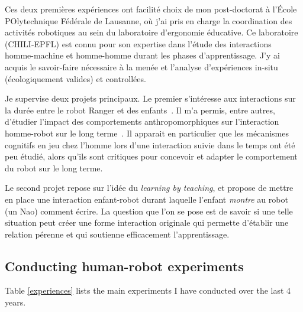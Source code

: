 \documentclass[a4paper]{article}
\begin{document}
Ces deux premières expériences ont facilité choix de mon post-doctorat à l'École
POlytechnique Fédérale de Lausanne, où j'ai pris en charge la coordination des
activités robotiques au sein du laboratoire d'ergonomie éducative. Ce
laboratoire (CHILI-EPFL) est connu pour son expertise dans l'étude des
interactions homme-machine et homme-homme durant les phases d'apprentissage. J'y
ai acquis le savoir-faire nécessaire à la menée et l'analyse d'expériences
in-situ (écologiquement valides) et controllées.

Je supervise deux projets principaux. Le premier s'intéresse aux interactions
sur la durée entre le robot Ranger et des enfants~\cite{fink2014which}. Il m'a
permis, entre autres, d'étudier l'impact des comportements anthropomorphiques
sur l'interaction homme-robot sur le long terme~\cite{lemaignan2014dynamics}. Il
apparait en particulier que les mécanismes cognitifs en jeu chez l'homme lors
d'une interaction suivie dans le temps ont été peu étudié, alors qu'ils sont
critiques pour concevoir et adapter le comportement du robot sur le long terme.

Le second projet repose sur l'idée du \emph{learning by teaching}, et propose de
mettre en place une interaction enfant-robot durant laquelle l'enfant
\emph{montre} au robot (un Nao) comment écrire. La question que l'on se pose est
de savoir si une telle situation peut créer une forme interaction originale qui
permette d'établir une relation pérenne et qui soutienne efficacement
l'apprentissage.

\subsection{Conducting human-robot experiments%
  \label{conducting-human-robot-experiments}%
}

Table \ref{experiences} lists the main experiments I have conducted over the
last 4 years.
\end{document}
